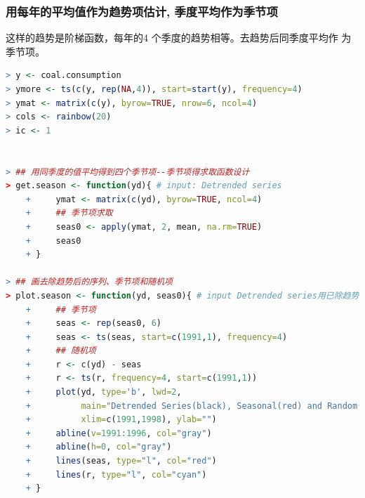 \documentclass[11pt,a4paper,oneside]{book}
\begin{document}
\subsubsection{用每年的平均值作为趋势项估计, 季度平均作为季节项}
这样的趋势是阶梯函数，每年的4 个季度的趋势相等。去趋势后同季度平均作
为季节项。

\begin{lstlisting}[language=r]
> y <- coal.consumption
> ymore <- ts(c(y, rep(NA,4)), start=start(y), frequency=4)
> ymat <- matrix(c(y), byrow=TRUE, nrow=6, ncol=4)
> cols <- rainbow(20)
> ic <- 1


> ## 用同季度的值平均得到四个季节项--季节项得求取函数设计
> get.season <- function(yd){ # input: Detrended series
	+     ymat <- matrix(c(yd), byrow=TRUE, ncol=4)
	+     ## 季节项求取
	+     seas0 <- apply(ymat, 2, mean, na.rm=TRUE)
	+     seas0
	+ }

> ## 画去除趋势后的序列、季节项和随机项
> plot.season <- function(yd, seas0){ # input Detrended series用已除趋势项的序列
	+     ## 季节项
	+     seas <- rep(seas0, 6)
	+     seas <- ts(seas, start=c(1991,1), frequency=4)
	+     ## 随机项
	+     r <- c(yd) - seas
	+     r <- ts(r, frequency=4, start=c(1991,1))
	+     plot(yd, type='b', lwd=2,
	+          main="Detrended Series(black), Seasonal(red) and Random(cyan)",
	+          xlim=c(1991,1998), ylab="")
	+     abline(v=1991:1996, col="gray")
	+     abline(h=0, col="gray")
	+     lines(seas, type="l", col="red")
	+     lines(r, type="l", col="cyan")
	+ }
\end{lstlisting}
\end{document}
